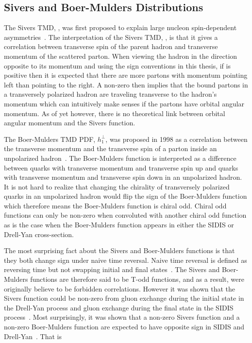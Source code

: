 \subsection{Sivers and Boer-Mulders Distributions}
The Sivers TMD, {\siv}, was first proposed to explain large nucleon
spin-dependent asymmetries~\cite{Sivers}.  The interpretation of the Sivers TMD,
{\siv}, is that it gives a correlation between transverse spin of the parent
hadron and transverse momentum of the scattered parton.  When viewing the hadron
in the direction opposite to its momentum and using the sign conventions in
this thesis, if {\siv} is positive then it is expected that there are more
partons with momentum pointing left than pointing to the right.  A non-zero
{\siv} then implies that the bound partons in a transversely polarized hadron
are traveling transverse to the hadron's momentum which can intuitively make
senses if the partons have orbital angular momentum.  As of yet however, there
is no theoretical link between orbital angular momentum and the Sivers function.

The Boer-Mulders TMD PDF, $h_1^{\perp}$, was proposed in 1998 as a correlation
between the transverse momentum and the transverse spin of a parton inside an
unpolarized hadron~\cite{Boer:1997nt}.  The Boer-Mulders function is interpreted
as a difference between quarks with transverse momentum and transverse spin up
and quarks with transverse momentum and transverse spin down in an unpolarized
hadron.  It is not hard to realize that changing the chirality of transversely
polarized quarks in an unpolarized hadron would flip the sign of the
Boer-Mulders function which therefore means the Boer-Mulders function is chiral
odd.  Chiral odd functions can only be non-zero when convoluted with another
chiral odd function as is the case when the Boer-Mulders function appears in
either the SIDIS or Drell-Yan cross-section.

The most surprising fact about the Sivers and Boer-Mulders functions is that
they both change sign under naive time reversal.  Naive time reversal is
defined as reversing time but not swapping initial and final
states~\cite{Bacchetta:2006tn}.  The Sivers and Boer-Mulders functions are
therefore said to be T-odd functions, and as a result, were originally believe
to be forbidden correlations.  However it was shown that the Sivers function
could be non-zero from gluon exchange during the initial state in the Drell-Yan
process and gluon exchange during the final state in the SIDIS
process~\cite{Brodsky:2002cx,Brodsky:2002rv}.  Most surprisingly, it was shown
that a non-zero Sivers function and a non-zero Boer-Mulders function are
expected to have opposite sign in SIDIS and Drell-Yan~\cite{collins_2002}.  That
is

